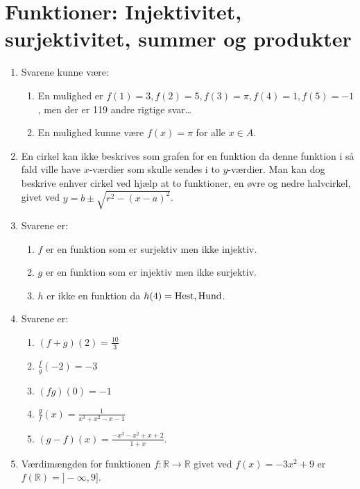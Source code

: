 \section{Funktioner: Injektivitet, surjektivitet, summer og produkter}
\begin{enumerate}
	\item  Svarene kunne være:
	\begin{enumerate}
		\item En mulighed er $ f(1)=3,f(2)=5,f(3)=\pi,f(4)=1,f(5)=-1 $, men der er 119 andre rigtige svar\dots
		\item En mulighed kunne være $f(x)=\pi$ for alle $x\in A$.
	\end{enumerate}
	
	
	\item En cirkel kan ikke beskrives som grafen for en funktion da denne funktion i så fald ville have $x$-værdier som skulle sendes i to $y$-værdier. Man kan dog beskrive enhver cirkel ved hjælp at to funktioner, en øvre og nedre halvcirkel, givet ved $y=b\pm \sqrt{r^2-(x-a)^2}$. 
	
	\item Svarene er:
	\begin{enumerate}
		\item $f$ er en funktion som er surjektiv men ikke injektiv.
		\item $g$ er en funktion som er injektiv men ikke surjektiv.
		\item $h$ er ikke en funktion da $h(4)=\textup{Hest},\textup{Hund}$.
	\end{enumerate}

	\item Svarene er:
	\begin{enumerate}
		\item $(f+g)(2)=\frac{10}{3}$
		\item $ \frac{f}{g}(-2) =-3$
		\item $(fg)(0)=-1$
		\item $\frac{g}{f}(x)=\frac{1}{x^3+x^2-x-1}$
		\item $(g-f)(x)=\frac{-x^3-x^2+x+2}{1+x}$.
	\end{enumerate}

	\item Værdimængden for funktionen $f\colon \mathbb{R}\to \mathbb{R}$ givet ved $f(x)=-3x^2+9$ er $f(\mathbb{R})=]-\infty,9]$.
	

\end{enumerate}
